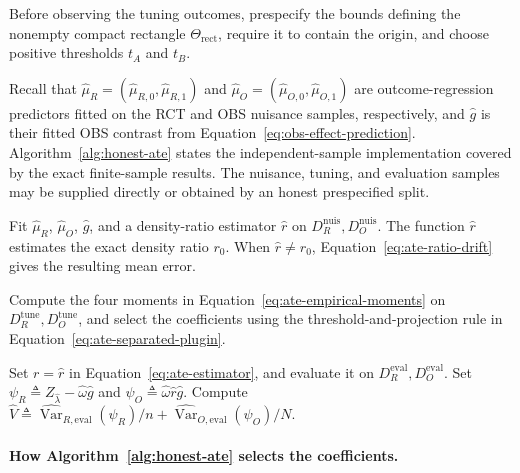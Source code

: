 Before observing the tuning outcomes, prespecify the bounds defining the nonempty compact rectangle $\Theta_{\mathrm{rect}}$, require it to contain the origin, and choose positive thresholds $t_A$ and $t_B$.

Recall that $\widehat\mu_R=(\widehat\mu_{R,0},\widehat\mu_{R,1})$ and $\widehat\mu_O=(\widehat\mu_{O,0},\widehat\mu_{O,1})$ are outcome-regression predictors fitted on the RCT and OBS nuisance samples, respectively, and $\widehat{g}$ is their fitted OBS contrast from Equation~\eqref{eq:obs-effect-prediction}. Algorithm~\ref{alg:honest-ate} states the independent-sample implementation covered by the exact finite-sample results. The nuisance, tuning, and evaluation samples may be supplied directly or obtained by an honest prespecified split.

\begin{algorithm}[H]
\caption{ATE estimation with honest evaluation}
\label{alg:honest-ate}
\DontPrintSemicolon
{}
Fit $\widehat\mu_R$, $\widehat\mu_O$, $\widehat{g}$, and a density-ratio estimator $\widehat r$ on $D_R^{\mathrm{nuis}},D_O^{\mathrm{nuis}}$. The function $\widehat r$ estimates the exact density ratio $r_0$. When $\widehat r\neq r_0$, Equation~\eqref{eq:ate-ratio-drift} gives the resulting mean error. \;

Compute the four moments in Equation~\eqref{eq:ate-empirical-moments} on $D_R^{\mathrm{tune}},D_O^{\mathrm{tune}}$, and select the coefficients using the threshold-and-projection rule in Equation~\eqref{eq:ate-separated-plugin}.\;

Set $r=\widehat r$ in Equation~\eqref{eq:ate-estimator}, and evaluate it on $D_R^{\mathrm{eval}},D_O^{\mathrm{eval}}$. Set $\psi_R\triangleq Z_{\widehat\lambda}-\widehat\omega \widehat{g}$ and $\psi_O\triangleq\widehat\omega\widehat r\widehat{g}$. Compute $\widehat V\triangleq \widehat{\operatorname{Var}}_{R,\mathrm{eval}}(\psi_R)/n+\widehat{\operatorname{Var}}_{O,\mathrm{eval}}(\psi_O)/N$.\;
\end{algorithm}

\paragraph{How Algorithm~\ref{alg:honest-ate} selects the coefficients.}

